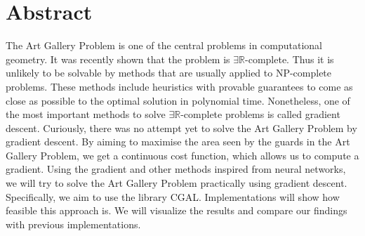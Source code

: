 \section*{Abstract}


The Art Gallery Problem is one of the central problems in computational geometry. It was recently shown that the problem is $\exists \mathbb{R}$-complete. Thus it is unlikely to be solvable by methods that are usually applied to NP-complete problems. These methods include heuristics with provable guarantees to come as close as possible to the optimal solution in polynomial time. Nonetheless, one of the most important methods to solve $\exists \mathbb{R}$-complete problems is called gradient descent. Curiously, there was no attempt yet to solve the Art Gallery Problem by gradient descent. By aiming to maximise the area seen by the guards in the Art Gallery Problem, we get a continuous cost function, which allows us to compute a gradient. Using the gradient and other methods inspired from neural networks, we will try to solve the Art Gallery Problem practically using gradient descent. Specifically, we aim to use the library CGAL. 
Implementations will show how feasible this approach is. We will visualize the results and compare our findings with previous implementations.